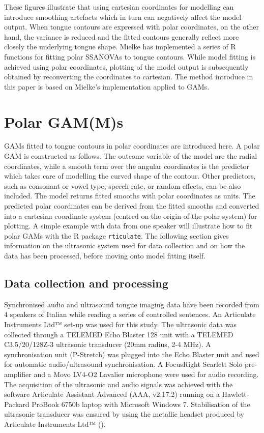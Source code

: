 \documentclass[12pt,]{article}
\begin{document}
These figures illustrate that using cartesian coordinates for modelling
can introduce smoothing artefacts which in turn can negatively affect
the model output. When tongue contours are expressed with polar
coordinates, on the other hand, the variance is reduced and the fitted
contours generally reflect more closely the underlying tongue shape.
Mielke has implemented a series of R \citep{r-core-team2018} functions
for fitting polar SSANOVAs to tongue contours. While model fitting is
achieved using polar coordinates, plotting of the model output is
subsequently obtained by reconverting the coordinates to cartesian. The
method introduce in this paper is based on Mielke's implementation
applied to GAMs.

\hypertarget{polar-gamms}{%
\section{Polar GAM(M)s}\label{polar-gamms}}

GAMs fitted to tongue contours in polar coordinates are introduced here.
A polar GAM is constructed as follows. The outcome variable of the model
are the radial coordinates, while a smooth term over the angular
coordinates is the predictor which takes care of modelling the curved
shape of the contour. Other predictors, such as consonant or vowel type,
speech rate, or random effects, can be also included. The model returns
fitted smooths with polar coordinates as units. The predicted polar
coordinates can be derived from the fitted smooths and converted into a
cartesian coordinate system (centred on the origin of the polar system)
for plotting. A simple example with data from one speaker will
illustrate how to fit polar GAMs with the R package \texttt{rticulate}.
The following section gives information on the ultrasonic system used
for data collection and on how the data has been processed, before
moving onto model fitting itself.

\hypertarget{data-collection-and-processing}{%
\subsection{Data collection and
processing}\label{data-collection-and-processing}}

\label{s:data}

Synchronised audio and ultrasound tongue imaging data have been recorded
from 4 speakers of Italian while reading a series of controlled
sentences. An Articulate Instruments Ltd™ set-up was used for this
study. The ultrasonic data was collected through a TELEMED Echo Blaster
128 unit with a TELEMED C3.5/20/128Z-3 ultrasonic transducer (20mm
radius, 2-4 MHz). A synchronisation unit (P-Stretch) was plugged into
the Echo Blaster unit and used for automatic audio/ultrasound
synchronisation. A FocusRight Scarlett Solo pre-amplifier and a Movo
LV4-O2 Lavalier microphone were used for audio recording. The
acquisition of the ultrasonic and audio signals was achieved with the
software Articulate Assistant Advanced (AAA, v2.17.2) running on a
Hawlett-Packard ProBook 6750b laptop with Microsoft Windows 7.
Stabilisation of the ultrasonic transducer was ensured by using the
metallic headset produced by Articulate Instruments Ltd™
(\citeyear{articulate2008}).
\end{document}
